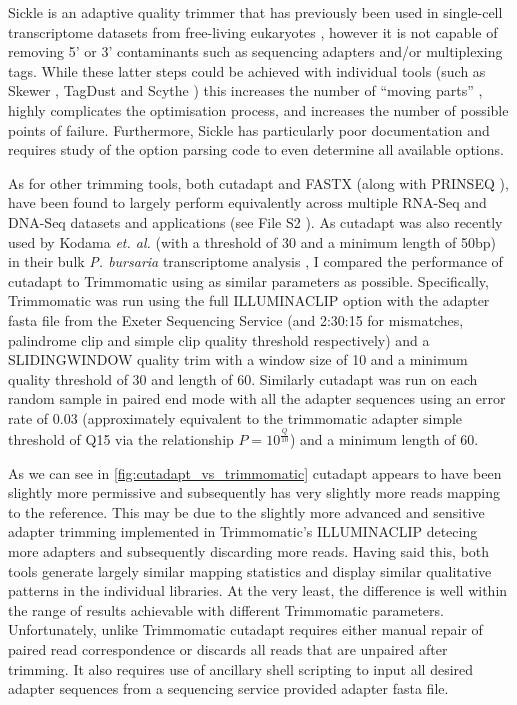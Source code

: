 Sickle is an adaptive quality trimmer that has previously been used in single-cell transcriptome datasets 
from free-living eukaryotes \citep{Kolisko2014}, however it is not capable of removing 
 5' or 3' contaminants such as sequencing adapters and/or multiplexing tags.  
While these latter steps could be achieved with individual tools (such as Skewer \citep{Jiang2014}, 
TagDust \citep{Lassmann2009} and Scythe \citep{Buffalo}) this increases the number of ``moving parts'' 
, highly complicates the optimisation process, and increases the number of possible points of failure.  
Furthermore, Sickle has particularly poor documentation and requires study of the option parsing code to 
even determine all available options.

As for other trimming tools, both cutadapt and FASTX (along with PRINSEQ \citep{Schmieder2011}), 
have been found to largely perform equivalently across multiple RNA-Seq and DNA-Seq datasets and applications 
(see File S2 \citep{DelFabbro2013}).
As cutadapt was also recently used by Kodama \textit{et. al.} (with a threshold of 30 and a minimum length of 50bp) 
in their bulk \textit{P. bursaria} transcriptome analysis \citep{Kodama2014}, I compared the performance
of cutadapt to Trimmomatic using as similar parameters as possible. Specifically, Trimmomatic
was run using the full ILLUMINACLIP option with the adapter fasta file from the Exeter 
Sequencing Service (and 2:30:15 for mismatches, palindrome clip and simple clip quality threshold respectively)
and a SLIDINGWINDOW quality trim with a window size of 10 and a minimum quality threshold of 30 and length of 60.
Similarly cutadapt was run on each random sample in paired end mode with all the adapter sequences using
an error rate of 0.03 (approximately equivalent to the trimmomatic adapter simple threshold of Q15 
via the relationship \(P=10^{\frac{Q}{10}}\)) and a minimum length of 60.

As we can see in \ref{fig:cutadapt_vs_trimmomatic} cutadapt appears to have been slightly more permissive
and subsequently has very slightly more reads mapping to the reference.  This may be due to the slightly
more advanced and sensitive adapter trimming implemented in Trimmomatic's ILLUMINACLIP detecing more 
adapters and subsequently discarding more reads.  Having said this, both tools generate largely similar
mapping statistics and display similar qualitative patterns in the individual libraries. 
At the very least, the difference is well within the range of results achievable with different
Trimmomatic parameters.  Unfortunately, unlike Trimmomatic cutadapt requires either manual repair of 
paired read correspondence or discards all reads that are unpaired after trimming. It also requires
use of ancillary shell scripting to input all desired adapter sequences from a sequencing service
provided adapter fasta file.

